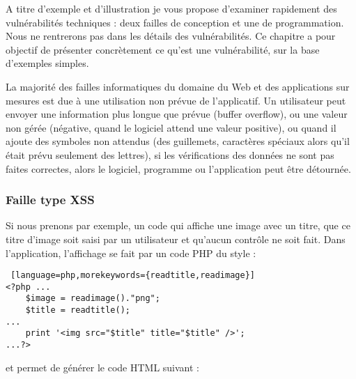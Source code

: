 A titre d'exemple et d'illustration je vous propose d'examiner rapidement des vulnérabilités techniques : deux failles de conception  et  une de programmation.
Nous ne rentrerons pas dans les détails des vulnérabilités. Ce chapitre a pour objectif de présenter concrètement ce qu'est une vulnérabilité, sur la base d'exemples simples.


La  majorité des failles informatiques du domaine du Web et des applications sur mesures est due à une utilisation non prévue de l'applicatif. Un utilisateur peut envoyer une information plus longue que prévue (buffer overflow), ou une valeur non gérée (négative, quand le logiciel attend une valeur positive), ou quand il ajoute des symboles non attendus (des guillemets, caractères spéciaux alors qu'il était prévu seulement des lettres), si les vérifications des données ne sont pas faites correctes, alors le logiciel, programme ou l’application peut être détournée. \\

\subsubsection{Faille type XSS}


Si nous prenons par exemple, un code qui affiche une image avec un titre, que ce titre d'image soit saisi par un utilisateur et qu'aucun contrôle ne soit fait. Dans l'application, l'affichage se fait par un code PHP du style : \\

\begin{lstlisting} [language=php,morekeywords={readtitle,readimage}]
<?php ...
	$image = readimage()."png";
	$title = readtitle();
...
	print '<img src="$title" title="$title" />';
...?>
\end{lstlisting}

et permet de générer le code HTML suivant : \\

